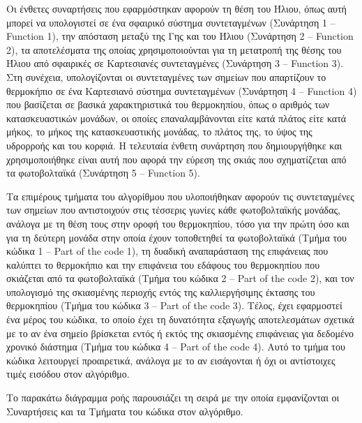 \documentclass[12pt, a4paper]{report} %
\newcommand{\english}{\foreignlanguage{english}}
\begin{document}
Οι ένθετες συναρτήσεις που εφαρμόστηκαν αφορούν τη θέση του Ήλιου, όπως αυτή μπορεί να υπολογιστεί σε ένα σφαιρικό 
σύστημα συντεταγμένων (Συνάρτηση 1 – \english{Function} 1), την απόσταση μεταξύ της Γης και του Ήλιου 
(Συνάρτηση 2 – \english{Function} 2), τα αποτελέσματα της οποίας χρησιμοποιούνται για τη μετατροπή της θέσης του Ήλιου 
από σφαιρικές σε Καρτεσιανές συντεταγμένες (Συνάρτηση 3 – \english{Function} 3). Στη συνέχεια, υπολογίζονται οι 
συντεταγμένες των σημείων που απαρτίζουν το θερμοκήπιο σε ένα Kαρτεσιανό σύστημα συντεταγμένων (Συνάρτηση 4 – 
\english{Function} 4) που βασίζεται σε βασικά χαρακτηριστικά του θερμοκηπίου, όπως ο αριθμός των κατασκευαστικών 
μονάδων, οι οποίες επαναλαμβάνονται είτε κατά πλάτος είτε κατά μήκος, το μήκος της κατασκευαστικής μονάδας, το πλάτος 
της, το ύψος της υδρορροής και του κορφιά. Η τελευταία ένθετη συνάρτηση που δημιουργήθηκε και χρησιμοποιήθηκε είναι 
αυτή που αφορά την εύρεση της σκιάς που σχηματίζεται από τα φωτοβολταϊκά (Συνάρτηση 5 – \english{Function} 5).

Τα επιμέρους τμήματα του αλγορίθμου που υλοποιήθηκαν αφορούν τις συντεταγμένες των σημείων που αντιστοιχούν στις 
τέσσερις γωνίες κάθε φωτοβολταϊκής μονάδας, ανάλογα με τη θέση τους στην οροφή του θερμοκηπίου, τόσο για την πρώτη 
όσο και για τη δεύτερη μονάδα στην οποία έχουν τοποθετηθεί τα φωτοβολταϊκά (Τμήμα του κώδικα 1 – 
\english{Part of the code} 1), τη δυαδική αναπαράσταση της επιφάνειας που καλύπτει το θερμοκήπιο και την επιφάνεια 
του εδάφους του θερμοκηπίου που σκιάζεται από τα φωτοβολταϊκά (Τμήμα του κώδικα 2 – \english{Part of the code} 2), 
και τον υπολογισμό της σκιασμένης περιοχής εντός της καλλιεργήσιμης έκτασης του θερμοκηπίου (Τμήμα του κώδικα 3 – 
\english{Part of the code} 3). Τέλος, έχει εφαρμοστεί ένα μέρος του κώδικα, το οποίο έχει τη δυνατότητα εξαγωγής 
αποτελεσμάτων σχετικά με το αν ένα σημείο βρίσκεται εντός ή εκτός της σκιασμένης επιφάνειας για δεδομένο χρονικό 
διάστημα (Τμήμα του κώδικα 4 – \english{Part of the code} 4). Αυτό το τμήμα του κώδικα λειτουργεί προαιρετικά, 
ανάλογα με το αν εισάγονται ή όχι οι αντίστοιχες τιμές εισόδου στον αλγόριθμο.

Το παρακάτω διάγραμμα ροής παρουσιάζει τη σειρά με την οποία εμφανίζονται οι Συναρτήσεις και τα Τμήματα του κώδικα 
στον αλγόριθμο.
\end{document}
